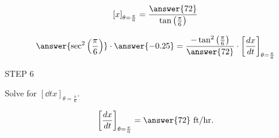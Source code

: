 \documentclass{ximera}
\begin{document}
\begin{exercise}
  
\[
\left[x\right]_{\theta=\frac{\pi}{6}}=\frac{\answer{72}}{\tan{\left(\frac{\pi}{6}\right)}}
\]


\[
\answer{\sec^{2}{\left(\frac{\pi}{6}\right)}}\cdot  \answer{-0.25} =\frac{-\tan^2{\left(\frac{\pi}{6}\right)}}{\answer{72}}\cdot \left[\frac{dx}{dt} \right]_{\theta=\frac{\pi}{6}}
\]



STEP 6

Solve for $ \left[\dd t {x} \right]_{\theta=\frac{\pi}{6}}$.

\[
 \left[\dfrac{dx}{dt} \right]_{\theta=\frac{\pi}{6}}=\answer{72}\text{  ft/hr}.
\]
\end{exercise}
\end{document}
